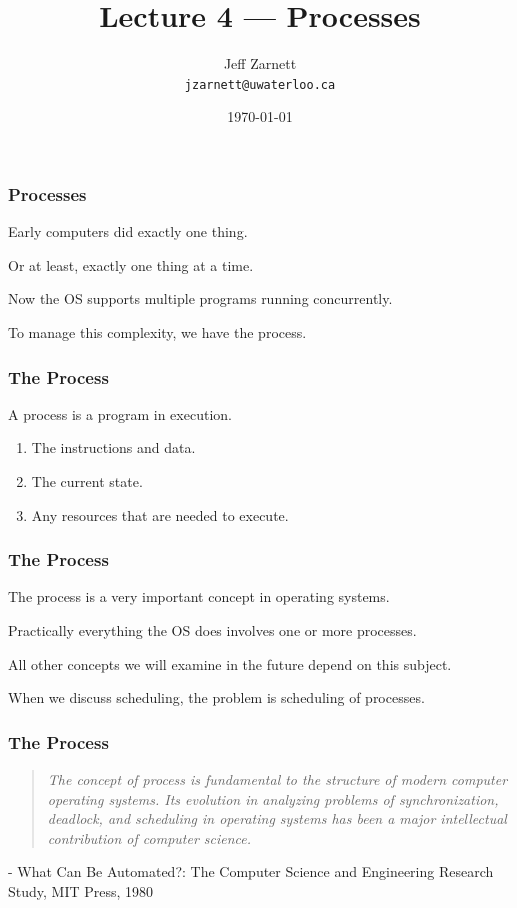 

\title{Lecture 4 --- Processes }

\author{Jeff Zarnett \\ \small \texttt{jzarnett@uwaterloo.ca}}
\date{\today}




\begin{frame}
  \titlepage

 \end{frame}

\begin{frame}
\frametitle{Processes}


Early computers did exactly one thing. 

Or at least, exactly one thing at a time.

Now the OS supports multiple programs running concurrently.

To manage this complexity, we have the \alert{process}.

\end{frame}

\begin{frame}
\frametitle{The Process}

A process is a program in execution.

\begin{enumerate}
	\item The instructions and data.
	\item The current state.
	\item Any resources that are needed to execute.
\end{enumerate}

\end{frame}

\begin{frame}
\frametitle{The Process}

The process is a very important concept in operating systems. 

Practically everything the OS does involves one or more processes.

All other concepts we will examine in the future depend on this subject. 

When we discuss scheduling, the problem is scheduling of processes.


\end{frame}

\begin{frame}
\frametitle{The Process}

\begin{quote}
\textit{The concept of process is fundamental to the structure of modern computer operating systems. Its evolution in analyzing problems of synchronization, deadlock, and scheduling in operating systems has been a major intellectual contribution of computer science.}
\end{quote}\vspace{-1.5em}
\hfill - What Can Be Automated?: The Computer Science and Engineering Research Study, MIT Press, 1980

\end{frame}

